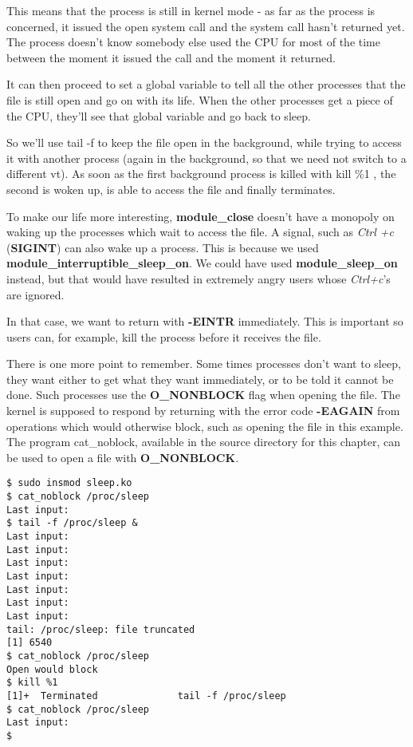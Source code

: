 \documentclass[10pt, oneside]{book}
\begin{document}
This means that the process is still in kernel mode - as far as the process is concerned, it issued the open system call and the system call hasn't returned yet. The process doesn't know somebody else used the CPU for most of the time between the moment it issued the call and the moment it returned.

It can then proceed to set a global variable to tell all the other processes that the file is still open and go on with its life. When the other processes get a piece of the CPU, they'll see that global variable and go back to sleep.

So we'll use tail -f to keep the file open in the background, while trying to access it with another process (again in the background, so that we need not switch to a different vt). As soon as the first background process is killed with kill \%1 , the second is woken up, is able to access the file and finally terminates.

To make our life more interesting, \textbf{module\_close} doesn't have a monopoly on waking up the processes which wait to access the file. A signal, such as \emph{Ctrl +c} (\textbf{SIGINT}) can also wake up a process. This is because we used \textbf{module\_interruptible\_sleep\_on}. We could have used \textbf{module\_sleep\_on} instead, but that would have resulted in extremely angry users whose \emph{Ctrl+c}'s are ignored.

In that case, we want to return with \textbf{-EINTR} immediately. This is important so users can, for example, kill the process before it receives the file.

There is one more point to remember. Some times processes don't want to sleep, they want either to get what they want immediately, or to be told it cannot be done. Such processes use the \textbf{O\_NONBLOCK} flag when opening the file. The kernel is supposed to respond by returning with the error code \textbf{-EAGAIN} from operations which would otherwise block, such as opening the file in this example. The program cat\_noblock, available in the source directory for this chapter, can be used to open a file with \textbf{O\_NONBLOCK}.

\begin{verbatim}
$ sudo insmod sleep.ko
$ cat_noblock /proc/sleep
Last input:
$ tail -f /proc/sleep &
Last input:
Last input:
Last input:
Last input:
Last input:
Last input:
Last input:
tail: /proc/sleep: file truncated
[1] 6540
$ cat_noblock /proc/sleep
Open would block
$ kill %1
[1]+  Terminated              tail -f /proc/sleep
$ cat_noblock /proc/sleep
Last input:
$
\end{verbatim}
\end{document}
